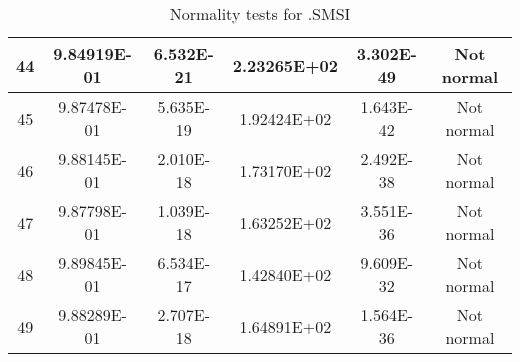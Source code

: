 \begin{table}[h]
\begin{tabular}{|c|c|c|c|c|c|}
		44 & 9.84919E-01 & 6.532E-21 & 2.23265E+02 & 3.302E-49 & Not normal\\\hline
		45 & 9.87478E-01 & 5.635E-19 & 1.92424E+02 & 1.643E-42 & Not normal\\\hline
		46 & 9.88145E-01 & 2.010E-18 & 1.73170E+02 & 2.492E-38 & Not normal\\\hline
		47 & 9.87798E-01 & 1.039E-18 & 1.63252E+02 & 3.551E-36 & Not normal\\\hline
		48 & 9.89845E-01 & 6.534E-17 & 1.42840E+02 & 9.609E-32 & Not normal\\\hline
		49 & 9.88289E-01 & 2.707E-18 & 1.64891E+02 & 1.564E-36 & Not normal\\\hline
	\end{tabular}
	\caption{Normality tests for .SMSI}
	\label{tab:normality_tests_SMSI}
\end{table}
